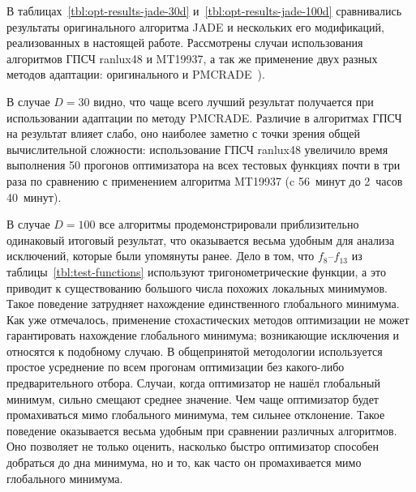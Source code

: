 В таблицах~\ref{tbl:opt-results-jade-30d}
и~\ref{tbl:opt-results-jade-100d} сравнивались результаты
оригинального алгоритма JADE и нескольких его модификаций,
реализованных в настоящей работе. Рассмотрены случаи использования
алгоритмов ГПСЧ ranlux48 и MT19937, а так же применение двух разных
методов адаптации: оригинального и PMCRADE~\cite{Li-PMCRADE-2011}).

В случае $D=30$ видно, что чаще всего лучший результат получается при
использовании адаптации по методу PMCRADE. Различие в алгоритмах ГПСЧ
на результат влияет слабо, оно наиболее заметно с точки зрения общей
вычислительной сложности: использование ГПСЧ ranlux48 увеличило
время выполнения 50 прогонов оптимизатора на всех тестовых функциях
почти в три раза по сравнению с применением алгоритма MT19937 (c
56~минут до 2~часов 40~минут).

В случае $D=100$ все алгоритмы продемонстрировали приблизительно
одинаковый итоговый результат, что оказывается весьма удобным для
 анализа исключений, которые были упомянуты
ранее. Дело в том, что $f_8$--$f_{13}$ из
таблицы~\ref{tbl:test-functions} используют тригонометрические
функции, а это приводит к существованию большого числа похожих локальных
минимумов. Такое поведение затрудняет нахождение единственного
глобального минимума.  Как уже отмечалось, применение стохастических
методов оптимизации не может гарантировать нахождение глобального
минимума; возникающие исключения и относятся к подобному случаю. В
общепринятой методологии используется простое усреднение по всем
прогонам оптимизации без какого-либо предварительного отбора.  Случаи,
когда оптимизатор не нашёл глобальный минимум, сильно смещают среднее
значение.  Чем чаще оптимизатор будет промахиваться мимо глобального
минимума, тем сильнее отклонение.  Такое поведение оказывается весьма
удобным при сравнении различных алгоритмов.  Оно позволяет не только
оценить, насколько быстро оптимизатор способен добраться до дна
минимума, но и то, как часто он промахивается мимо глобального
минимума.

